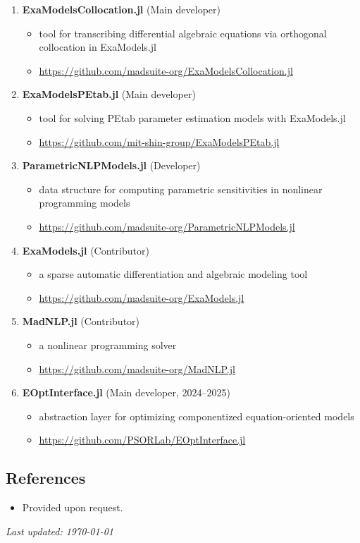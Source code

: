 \documentclass[letterpaper, 11pt]{article}
\begin{document}
\begin{enumerate}[itemsep=0pt]
\renewcommand*{\labelenumi}{[S\theenumi]}
\item \textbf{ExaModelsCollocation.jl} (Main developer)
  \begin{itemize}[leftmargin=*,topsep=0pt,label=$\bullet$,topsep=-5pt,itemsep=-1pt]
  \item tool for transcribing differential algebraic equations via orthogonal collocation in ExaModels.jl
  \item \url{https://github.com/madsuite-org/ExaModelsCollocation.jl}
  \end{itemize}
\item \textbf{ExaModelsPEtab.jl} (Main developer)
  \begin{itemize}[leftmargin=*,topsep=0pt,label=$\bullet$,topsep=-5pt,itemsep=-1pt]
  \item tool for solving PEtab parameter estimation models with ExaModels.jl
  \item \url{https://github.com/mit-shin-group/ExaModelsPEtab.jl}
  \end{itemize}
\item \textbf{ParametricNLPModels.jl} (Developer)
  \begin{itemize}[leftmargin=*,topsep=0pt,label=$\bullet$,topsep=-5pt,itemsep=-1pt]
  \item data structure for computing parametric sensitivities in nonlinear programming models
  \item \url{https://github.com/madsuite-org/ParametricNLPModels.jl}
  \end{itemize}
\item \textbf{ExaModels.jl} (Contributor)
  \begin{itemize}[leftmargin=*,topsep=0pt,label=$\bullet$,topsep=-5pt,itemsep=-1pt]
  \item a sparse automatic differentiation and algebraic modeling tool
  \item \url{https://github.com/madsuite-org/ExaModels.jl}
  \end{itemize}
\item \textbf{MadNLP.jl} (Contributor)
  \begin{itemize}[leftmargin=*,topsep=0pt,label=$\bullet$,topsep=-5pt,itemsep=-1pt]
  \item a nonlinear programming solver
  \item \url{https://github.com/madsuite-org/MadNLP.jl}
  \end{itemize}
\item \textbf{EOptInterface.jl} (Main developer, 2024--2025)
  \begin{itemize}[leftmargin=*,topsep=0pt,label=$\bullet$,topsep=-5pt,itemsep=-1pt]
  \item abstraction layer for optimizing componentized equation-oriented models
  \item \url{https://github.com/PSORLab/EOptInterface.jl}
  \end{itemize}
\end{enumerate}

\subsection*{References}
\begin{itemize}[itemsep=1pt, parsep=0pt,leftmargin=*]
\item[] Provided upon request.
\end{itemize}

{\noindent\it Last updated: \today}
\end{document}
